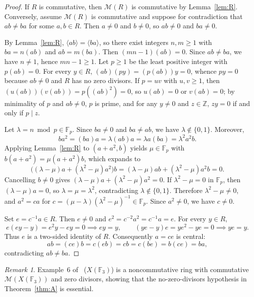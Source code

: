 \documentclass[11pt]{article}
\theoremstyle{remark}
\newtheorem*{remark}{Remark}
\begin{document}
\begin{proof}
If $R$ is commutative, then $\mathcal{M}(R)$ is commutative by Lemma~\ref{lem:R}. Conversely, assume $\mathcal{M}(R)$ is commutative and suppose for contradiction that $ab \ne ba$ for some $a, b \in R$. Then $a \ne 0$ and $b \ne 0$, so $ab \ne 0$ and $ba \ne 0$.

By Lemma~\ref{lem:R}, $\langle ab \rangle = \langle ba \rangle$, so there exist integers $n, m \ge 1$ with $ba = n(ab)$ and $ab = m(ba)$. Then $(mn - 1)(ab) = 0$. Since $ab \ne ba$, we have $n \ne 1$, hence $mn - 1 \ge 1$. Let $p \ge 1$ be the least positive integer with $p(ab) = 0$. For every $y \in R$, $(ab)(py) = (p(ab))y = 0$, whence $py = 0$ because $ab \ne 0$ and $R$ has no zero divisors. If $p = uv$ with $u, v \ge 1$, then $(u(ab))(v(ab)) = p((ab)^2) = 0$, so $u(ab) = 0$ or $v(ab) = 0$; by minimality of $p$ and $ab \ne 0$, $p$ is prime, and for any $y \ne 0$ and $z \in \mathbb{Z}$, $zy = 0$ if and only if $p \mid z$.

Let $\lambda = n \bmod p \in \mathbb{F}_p$. Since $ba \ne 0$ and $ba \ne ab$, we have $\lambda \notin \{0, 1\}$. Moreover,
\[
  ba^2 = (ba)a = \lambda(ab)a = \lambda a(ba) = \lambda^2 a^2 b.
\]
Applying Lemma~\ref{lem:R} to $(a + a^2, b)$ yields $\mu \in \mathbb{F}_p$ with $b(a + a^2) = \mu(a + a^2)b$, which expands to
\[
  \bigl((\lambda - \mu)a + (\lambda^2 - \mu)a^2\bigr)b = (\lambda - \mu)ab + (\lambda^2 - \mu)a^2 b = 0.
\]
Cancelling $b \ne 0$ gives $(\lambda - \mu)a + (\lambda^2 - \mu)a^2 = 0$. If $\lambda^2 - \mu = 0$ in $\mathbb{F}_p$, then $(\lambda - \mu)a = 0$, so $\lambda = \mu = \lambda^2$, contradicting $\lambda \notin \{0, 1\}$. Therefore $\lambda^2 - \mu \ne 0$, and $a^2 = ca$ for $c = (\mu - \lambda)(\lambda^2 - \mu)^{-1} \in \mathbb{F}_p$. Since $a^2 \ne 0$, we have $c \ne 0$.

Set $e = c^{-1}a \in R$. Then $e \ne 0$ and $e^2 = c^{-2}a^2 = c^{-1}a = e$. For every $y \in R$,
\[
  e(ey - y) = e^2 y - ey = 0 \implies ey = y, \qquad (ye - y)e = ye^2 - ye = 0 \implies ye = y.
\]
Thus $e$ is a two-sided identity of $R$. Consequently $a = ce$ is central:
\[
  ab = (ce)b = c(eb) = cb = c(be) = b(ce) = ba,
\]
contradicting $ab \ne ba$.
\end{proof}

\begin{remark}
Example~6 of~\cite{Mesyan2026} ($X(\mathbb{F}_3)$) is a noncommutative ring with commutative $\mathcal{M}(X(\mathbb{F}_3))$ and zero divisors, showing that the no-zero-divisors hypothesis in Theorem~\ref{thm:A} is essential.
\end{remark}
\end{document}
